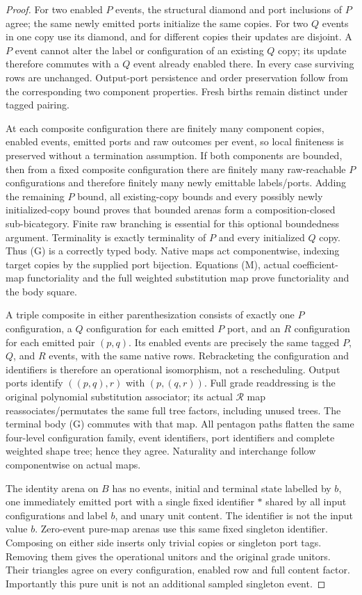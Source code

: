 \documentclass[11pt]{article}
\begin{document}
\begin{proof}
For two enabled $P$ events, the structural diamond and port inclusions of $P$ agree; the same newly emitted ports initialize the same copies. For two $Q$ events in one copy use its diamond, and for different copies their updates are disjoint. A $P$ event cannot alter the label or configuration of an existing $Q$ copy; its update therefore commutes with a $Q$ event already enabled there. In every case surviving rows are unchanged. Output-port persistence and order preservation follow from the corresponding two component properties. Fresh births remain distinct under tagged pairing.

At each composite configuration there are finitely many component copies, enabled events, emitted ports and raw outcomes per event, so local finiteness is preserved without a termination assumption. If both components are bounded, then from a fixed composite configuration there are finitely many raw-reachable $P$ configurations and therefore finitely many newly emittable labels/ports. Adding the remaining $P$ bound, all existing-copy bounds and every possibly newly initialized-copy bound proves that bounded arenas form a composition-closed sub-bicategory. Finite raw branching is essential for this optional boundedness argument. Terminality is exactly terminality of $P$ and every initialized $Q$ copy. Thus (G) is a correctly typed body. Native maps act componentwise, indexing target copies by the supplied port bijection. Equations (M), actual coefficient-map functoriality and the full weighted substitution map prove functoriality and the body square.

A triple composite in either parenthesization consists of exactly one $P$ configuration, a $Q$ configuration for each emitted $P$ port, and an $R$ configuration for each emitted pair $(p,q)$. Its enabled events are precisely the same tagged $P$, $Q$, and $R$ events, with the same native rows. Rebracketing the configuration and identifiers is therefore an operational isomorphism, not a rescheduling. Output ports identify $((p,q),r)$ with $(p,(q,r))$. Full grade readdressing is the original polynomial substitution associator; its actual $\mathcal R$ map reassociates/permutates the same full tree factors, including unused trees. The terminal body (G) commutes with that map. All pentagon paths flatten the same four-level configuration family, event identifiers, port identifiers and complete weighted shape tree; hence they agree. Naturality and interchange follow componentwise on actual maps.

The identity arena on $B$ has no events, initial and terminal state labelled by $b$, one immediately emitted port with a single fixed identifier $*$ shared by all input configurations and label $b$, and unary unit content. The identifier is not the input value $b$. Zero-event pure-map arenas use this same fixed singleton identifier. Composing on either side inserts only trivial copies or singleton port tags. Removing them gives the operational unitors and the original grade unitors. Their triangles agree on every configuration, enabled row and full content factor. Importantly this pure unit is not an additional sampled singleton event.\end{proof}
\end{document}
